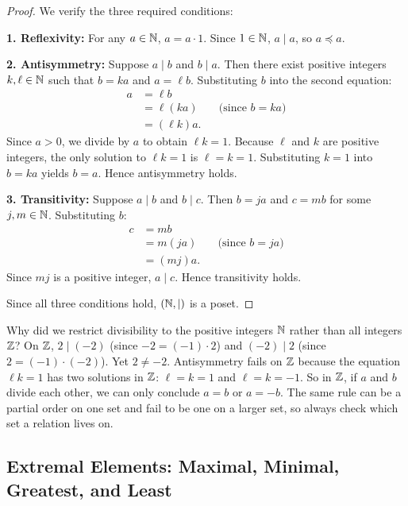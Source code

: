 \begin{proof}
We verify the three required conditions:

\textbf{1. Reflexivity:} For any $a \in \mathbb{N}$, $a = a \cdot 1$. Since $1 \in \mathbb{N}$, $a \mid a$, so $a \preceq a$.

\textbf{2. Antisymmetry:} Suppose $a \mid b$ and $b \mid a$.
Then there exist positive integers $k, \ell \in \mathbb{N}$ such that $b = k a$ and $a = \ell b$.
Substituting $b$ into the second equation:
\begin{align*}
a &= \ell b \\
  &= \ell (k a) && \text{(since $b = k a$)} \\
  &= (\ell k) a.
\end{align*}
Since $a > 0$, we divide by $a$ to obtain $\ell k = 1$.
Because $\ell$ and $k$ are positive integers, the only solution to $\ell k = 1$ is $\ell = k = 1$.
Substituting $k = 1$ into $b = k a$ yields $b = a$. Hence antisymmetry holds.

\textbf{3. Transitivity:} Suppose $a \mid b$ and $b \mid c$.
Then $b = j a$ and $c = m b$ for some $j, m \in \mathbb{N}$.
Substituting $b$:
\begin{align*}
c &= m b \\
  &= m (j a) && \text{(since $b = j a$)} \\
  &= (m j) a.
\end{align*}
Since $m j$ is a positive integer, $a \mid c$. Hence transitivity holds.

Since all three conditions hold, $(\mathbb{N}, \mid)$ is a poset.
\end{proof}

\begin{trapbox}
Why did we restrict divisibility to the positive integers $\mathbb{N}$ rather than all integers $\mathbb{Z}$?
On $\mathbb{Z}$, $2 \mid (-2)$ (since $-2 = (-1) \cdot 2$) and $(-2) \mid 2$ (since $2 = (-1) \cdot (-2)$). Yet $2 \neq -2$. Antisymmetry fails on $\mathbb{Z}$ because the equation $\ell k = 1$ has two solutions in $\mathbb{Z}$: $\ell = k = 1$ and $\ell = k = -1$. So in $\mathbb{Z}$, if $a$ and $b$ divide each other, we can only conclude $a = b$ or $a = -b$. The same rule can be a partial order on one set and fail to be one on a larger set, so always check which set a relation lives on.
\end{trapbox}

\subsection{Extremal Elements: Maximal, Minimal, Greatest, and Least}

